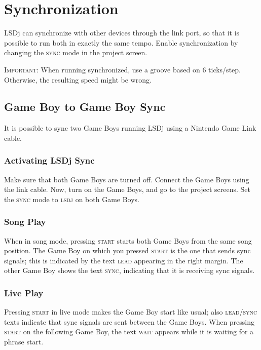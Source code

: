 \chapter{Synchronization}
\label{sync-chapter}

LSDj can synchronize with other devices through the link port, so that it is possible to run both in exactly the same tempo. Enable synchronization by changing the \textsc{sync} mode in the project screen.

\textsc{Important}: When running synchronized, use a groove based on 6 ticks/step. Otherwise, the resulting speed might be wrong.

\section{Game Boy to Game Boy Sync}

It is possible to sync two Game Boys running LSDj using a Nintendo Game Link cable.

\subsection{Activating LSDj Sync}

Make sure that both Game Boys are turned off. Connect the Game Boys using the link cable. Now, turn on the Game Boys, and go to the project screens. Set the \textsc{sync} mode to \textsc{lsdj} on both Game Boys.

\subsection{Song Play}

When in song mode, pressing \textsc{start} starts both Game Boys from the same song position. The Game Boy on which you pressed \textsc{start} is the one that sends sync signals; this is indicated by the text \textsc{lead} appearing in the right margin. The other Game Boy shows the text \textsc{sync}, indicating that it is receiving sync signals.

\subsection{Live Play}

Pressing \textsc{start} in live mode makes the Game Boy start like usual; also \textsc{lead}/\textsc{sync} texts indicate that sync signals are sent between the Game Boys. When pressing \textsc{start} on the following Game Boy, the text \textsc{wait} appears while it is waiting for a phrase start.

